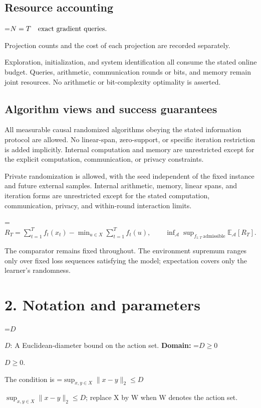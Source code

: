 \documentclass[10pt,a4paper]{article}
\newcommand{\AtlasMath}[1]{\par\begingroup\centering\setbox0=\hbox{$\displaystyle #1$}\ifdim\wd0>1.4\linewidth\typeout{ATLAS WIDE FORMULA: \the\wd0}\fi\ifdim\wd0>\linewidth\resizebox{\linewidth}{!}{\box0}\else\box0\fi\par\endgroup}
\newcommand{\AtlasInlineMath}[1]{\begingroup\setbox0=\hbox{$#1$}\ifdim\wd0>.4\linewidth\endgroup\AtlasMath{#1}\else\endgroup$#1$\fi}
\begin{document}
\subsection{Resource accounting}

\AtlasMath{N=T\quad\text{\text{exact gradient queries}}.}


Projection counts and the cost of each projection are recorded separately.

Exploration, initialization, and system identification all consume the stated online budget. Queries, arithmetic, communication rounds or bits, and memory remain joint resources. No arithmetic or bit-complexity optimality is asserted.

\subsection{Algorithm views and success guarantees}
All measurable causal randomized algorithms obeying the stated information protocol are allowed. No linear-span, zero-support, or specific iteration restriction is added implicitly. Internal computation and memory are unrestricted except for the explicit computation, communication, or privacy constraints.

Private randomization is allowed, with the seed independent of the fixed instance and future external samples. Internal arithmetic, memory, linear spans, and iteration forms are unrestricted except for the stated computation, communication, privacy, and within-round interaction limits.


\AtlasMath{R_T=\sum_{t=1}^{T}f_t(x_t)-\min_{u\in X}\sum_{t=1}^{T}f_t(u),\qquad \inf_{\mathcal A}\sup_{f_{1:T}\ \text{admissible}}\mathbb E_{\mathcal A}[R_T].}


The comparator remains fixed throughout. The environment supremum ranges only over fixed loss sequences satisfying the model; expectation covers only the learner's randomness.

\section{2. Notation and parameters}
\AtlasInlineMath{D}: A Euclidean-diameter bound on the action set. \textbf{Domain:} \AtlasInlineMath{D\ge0}.

The condition is \AtlasInlineMath{\sup_{x,y\in X}\|x-y\|_2\le D}; replace X by W when W denotes the action set.
\end{document}

